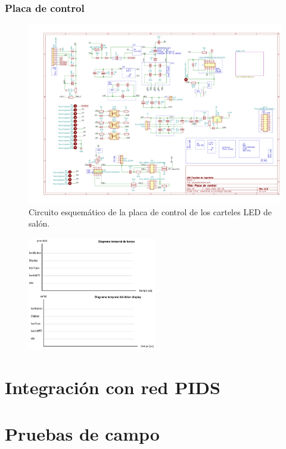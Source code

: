 \subsubsection{Placa de control}

\begin{figure}[ht]
	\centering
	\includegraphics[width=1\textwidth]{./Figures/output.placaControl.pdf}
	\caption{Circuito esquemático de la placa de control de los carteles LED de salón.}
	\label{fig:schController}
\end{figure}


\begin{figure}[ht]
	\centering
	\includegraphics[width=0.5\textwidth]{./Figures/diagramasTemporales.png}
	\caption{}
	\label{fig:diagramasTemporales}
\end{figure}

\section{Integración con red PIDS}

\section{Pruebas de campo}

